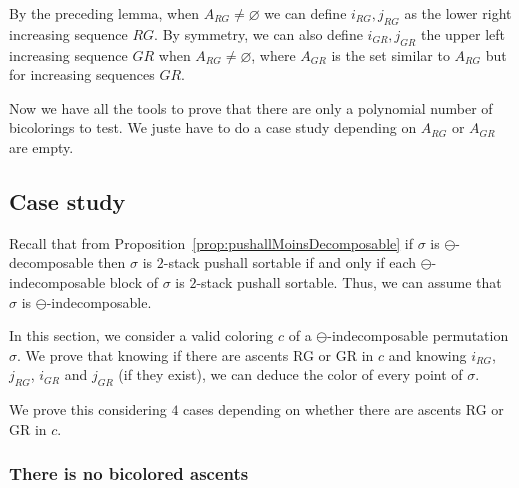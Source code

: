 \documentclass[11pt]{article}
\newcommand{\ascentRG}{increasing sequence $RG$\xspace}
\newcommand{\ascentGR}{increasing sequence $GR$\xspace}
\newcommand{\ascentsGR}{increasing sequences $GR$\xspace}
\begin{document}
By the preceding lemma, when $A_{RG} \neq \varnothing$ we can define $i_{RG},j_{RG}$ as the lower right \ascentRG. 
By symmetry, we can also define $i_{GR},j_{GR}$ the upper left \ascentGR when $A_{RG} \neq \varnothing$, where $A_{GR}$ is the set similar to $A_{RG}$ but for \ascentsGR.


Now we have all the tools to prove that there are only a polynomial number of bicolorings to test. 
We juste have to do a case study depending on $A_{RG}$ or $A_{GR}$ are empty.


\subsection{Case study}

Recall that from Proposition~\ref{prop:pushallMoinsDecomposable} if $\sigma$ is $\ominus$-decomposable then $\sigma$ is $2$-stack pushall sortable 
if and only if each $\ominus$-indecomposable block of $\sigma$ is $2$-stack pushall sortable.
Thus, we can assume that $\sigma$ is $\ominus$-indecomposable.

In this section, we consider a valid coloring $c$ of a $\ominus$-indecomposable permutation $\sigma$.
We prove that knowing if there are ascents RG or GR in $c$ and knowing $i_{RG}$, $j_{RG}$, $i_{GR}$ and $j_{GR}$ (if they exist), we can deduce the color of every point of $\sigma$.

We prove this considering $4$ cases depending on whether there are ascents RG or GR in $c$.


\subsubsection{There is no bicolored ascents}
\end{document}

